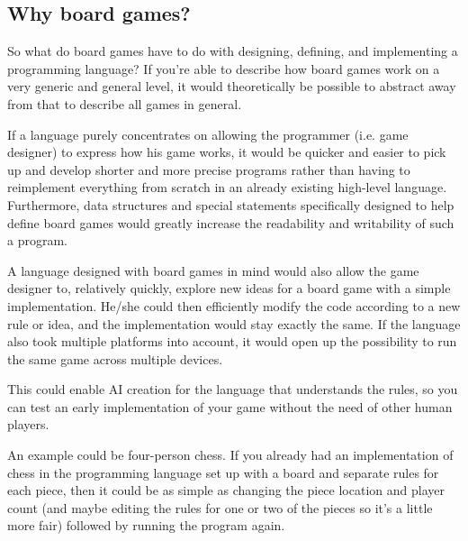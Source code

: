 \subsection{Why board games?}
\label{whyboardgames}


So what do board games have to do with designing,
defining, and implementing a programming language?
If you're able to describe how board games work
on a very generic and general level, it would
theoretically be possible to abstract away from
that to describe all games in general.

If a language purely concentrates on allowing the
programmer (i.e. game designer) to express how his
game works, it would be quicker and easier to pick
up and develop shorter and more precise programs
rather than having to reimplement everything
from scratch in an already existing high-level
language. Furthermore, data structures and special
statements specifically designed to help define
board games would greatly increase the readability
and writability of such a program.

A language designed with board games in mind
would also allow the game designer to, relatively
quickly, explore new ideas for a board game
with a simple implementation. He/she could then
efficiently modify the code according to a new
rule or idea, and the implementation would stay
exactly the same. If the language also took
multiple platforms into account, it would open
up the possibility to run the same game across
multiple devices.

This could enable AI creation for the language
that understands the rules, so you can test an
early implementation of your game without the need
of other human players.

An example could be four-person chess. If you
already had an implementation of chess in the
programming language set up with a board and
separate rules for each piece, then it could be as
simple as changing the piece location and player
count (and maybe editing the rules for one or two
of the pieces so it's a little more fair) followed
by running the program again.


